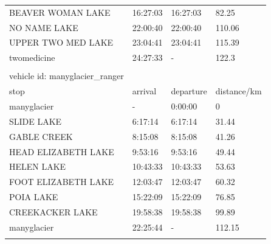 \documentclass[12pt]{article}
\begin{document}
\begin{appendices}
\begin{table}[ht!]
\begin{tabular}{@{}llll@{}}
BEAVER WOMAN LAKE                & 16:27:03 & 16:27:03  & 82.25       \\
NO NAME LAKE                     & 22:00:40 & 22:00:40  & 110.06      \\
UPPER TWO MED LAKE               & 23:04:41 & 23:04:41  & 115.39      \\
twomedicine                      & 24:27:33  & -         & 122.3       \\ \bottomrule
                                 &          &           &             \\ \toprule
vehicle id: manyglacier\_ranger  &          &           &             \\ \midrule
stop                             & arrival  & departure & distance/km \\
manyglacier                      & -        & 0:00:00   & 0           \\
SLIDE LAKE                       & 6:17:14  & 6:17:14   & 31.44       \\
GABLE CREEK                      & 8:15:08  & 8:15:08   & 41.26       \\
HEAD ELIZABETH LAKE              & 9:53:16  & 9:53:16   & 49.44       \\
HELEN LAKE                       & 10:43:33 & 10:43:33  & 53.63       \\
FOOT ELIZABETH LAKE              & 12:03:47 & 12:03:47  & 60.32       \\
POIA LAKE                        & 15:22:09 & 15:22:09  & 76.85       \\
CREEKACKER LAKE                  & 19:58:38 & 19:58:38  & 99.89       \\
manyglacier                      & 22:25:44 & -         & 112.15      \\ \bottomrule
                                 &          &           &             \\
\end{tabular}
\end{table}


\end{appendices}
\end{document}
